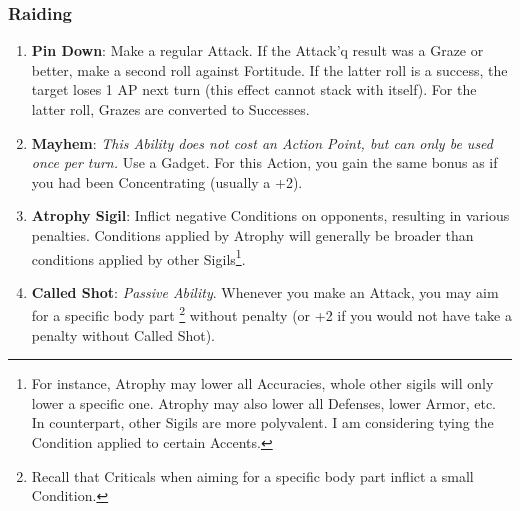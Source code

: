 \subsubsection{Raiding}
\begin{enumerate}
    \item \textbf{Pin Down}: Make a regular Attack. If the Attack'q result was a Graze or better, make a second roll against Fortitude. If the latter roll is a success, the target loses 1 AP next turn (this effect cannot stack with itself). For the latter roll, Grazes are converted to Successes.
    \item \textbf{Mayhem}: \textit{This Ability does not cost an Action Point, but can only be used once per turn.} Use a Gadget. For this Action, you gain the same bonus as if you had been Concentrating (usually a +2).
    \item \textbf{Atrophy Sigil}: Inflict negative Conditions on opponents, resulting in various penalties. Conditions applied by Atrophy will generally be broader than conditions applied by other Sigils\footnote{For instance, Atrophy may lower all Accuracies, whole other sigils will only lower a specific one. Atrophy may also lower all Defenses, lower Armor, etc. In counterpart, other Sigils are more polyvalent. I am considering tying the Condition applied to certain Accents.}.
    \item \textbf{Called Shot}: \textit{Passive Ability}. Whenever you make an Attack, you may aim for a specific body part \footnote{Recall that Criticals when aiming for a specific body part inflict a small Condition.} without penalty (or +2 if you would not have take a penalty without Called Shot).
\end{enumerate}

